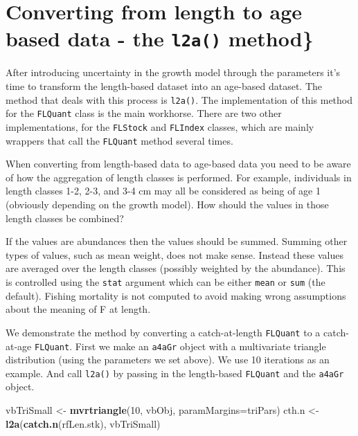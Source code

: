 \documentclass[
]{book}
\newenvironment{Shaded}{\begin{snugshade}}{\end{snugshade}}
\newcommand{\AttributeTok}[1]{\textcolor[rgb]{0.13,0.29,0.53}{#1}}
\newcommand{\DecValTok}[1]{\textcolor[rgb]{0.00,0.00,0.81}{#1}}
\newcommand{\FunctionTok}[1]{\textcolor[rgb]{0.13,0.29,0.53}{\textbf{#1}}}
\newcommand{\NormalTok}[1]{#1}
\newcommand{\OtherTok}[1]{\textcolor[rgb]{0.56,0.35,0.01}{#1}}
\begin{document}
\hypertarget{converting-from-length-to-age-based-data---the-l2a-method}{%
\section{\texorpdfstring{Converting from length to age based data - the \texttt{l2a()} method\}}{Converting from length to age based data - the l2a() method\}}}\label{converting-from-length-to-age-based-data---the-l2a-method}}

After introducing uncertainty in the growth model through the parameters it's time to transform the length-based dataset into an age-based dataset. The method that deals with this process is \texttt{l2a()}. The implementation of this method for the \texttt{FLQuant} class is the main workhorse. There are two other implementations, for the \texttt{FLStock} and \texttt{FLIndex} classes, which are mainly wrappers that call the \texttt{FLQuant} method several times.

When converting from length-based data to age-based data you need to be aware of how the aggregation of length classes is performed. For example, individuals in length classes 1-2, 2-3, and 3-4 cm may all be considered as being of age 1 (obviously depending on the growth model). How should the values in those length classes be combined?

If the values are abundances then the values should be summed. Summing other types of values, such as mean weight, does not make sense. Instead these values are averaged over the length classes (possibly weighted by the abundance). This is controlled using the \texttt{stat} argument which can be either \texttt{mean} or \texttt{sum} (the default). Fishing mortality is not computed to avoid making wrong assumptions about the meaning of F at length.

We demonstrate the method by converting a catch-at-length \texttt{FLQuant} to a catch-at-age \texttt{FLQuant}. First we make an \texttt{a4aGr} object with a multivariate triangle distribution (using the parameters we set above). We use 10 iterations as an example. And call \texttt{l2a()} by passing in the length-based \texttt{FLQuant} and the \texttt{a4aGr} object.

\begin{Shaded}
\begin{Highlighting}[]
\NormalTok{vbTriSmall }\OtherTok{\textless{}{-}} \FunctionTok{mvrtriangle}\NormalTok{(}\DecValTok{10}\NormalTok{, vbObj, }\AttributeTok{paramMargins=}\NormalTok{triPars)}
\NormalTok{cth.n }\OtherTok{\textless{}{-}} \FunctionTok{l2a}\NormalTok{(}\FunctionTok{catch.n}\NormalTok{(rfLen.stk), vbTriSmall)}
\end{Highlighting}
\end{Shaded}
\end{document}
